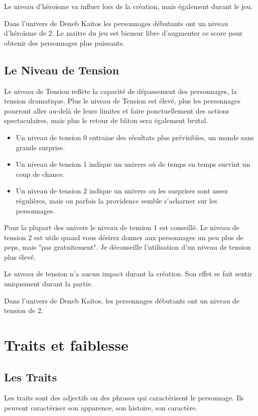 \begin{multicols}{2}
Le niveau d'héroïsme va influer lors de la création, mais également durant le jeu.

Dans l'univers de Deneb Kaitos les personnages débutants ont un niveau d'héroïsme de 2. Le maitre du jeu est biensur libre d'augmenter ce score pour obtenir des personnages plus puissants.

\subsection{Le Niveau de Tension}

Le niveau de Tension reflète la capacité de dépassement des personnages, la tension dramatique. Plus le niveau de Tension est élevé, plus les personnages pourront aller au-delà de leurs limites et faire ponctuellement des actions spectaculaires, mais plus le retour de bâton sera également brutal.

\begin{itemize}
\item Un niveau de tension 0 entraine des résultats plus prévisibles, un monde sans grande surprise.
\item Un niveau de tension 1 indique un univers où de temps en temps survint un coup de chance.
\item Un niveau de tension 2 indique un univers ou les surprises sont assez régulières, mais ou parfois la providence semble s'acharner sur les personnages.
\end{itemize}

Pour la plupart des univers le niveau de tension 1 est conseillé. Le niveau de tension 2 est utile quand vous désirez donner aux personnages un peu plus de peps, mais "pas gratuitement". Je déconseille l'utilisation d'un niveau de tension plus élevé.

Le niveau de tension n'a aucun impact durant la création. Son effet se fait sentir uniquement durant la partie.

Dans l'univers de Deneb Kaitos, les personnages débutants ont un niveau de tension de 2.

\section{Traits et faiblesse}

\subsection{Les Traits}

Les traits sont des adjectifs ou des phrases qui caractérisent le personnage. Ils peuvent caractériser son apparence, son histoire, son caractère.


\end{multicols}
